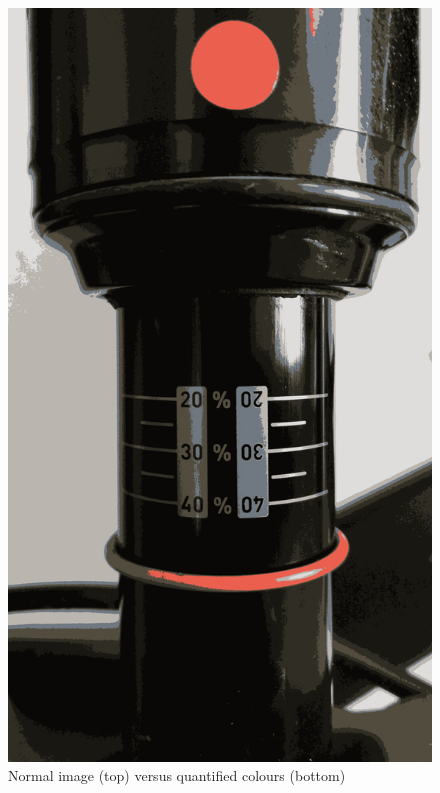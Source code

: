 \begin{figure}[h!]
				\includegraphics[scale=0.1,trim={0 140cm 0 0},clip]{../images/results/quant.jpg}
				\caption{Normal image (top) versus quantified colours (bottom)}
				\label{fig:quantified_colours}
			\end{figure}

